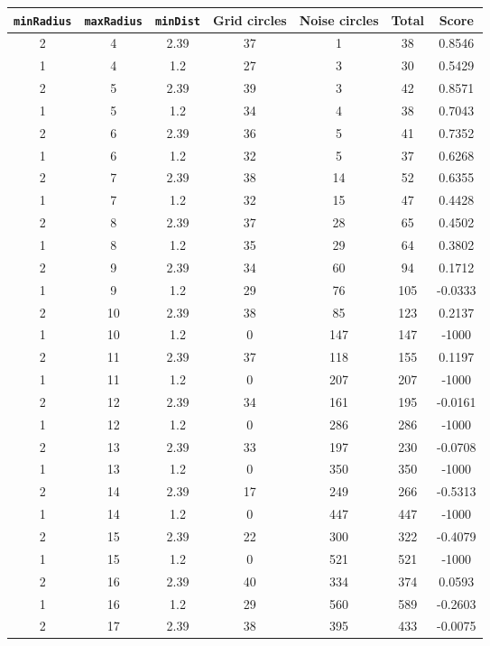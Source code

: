 \documentclass[letterpaper, 12pt]{article}
\begin{document}
\begin{longtable}{|c|c|c|c|c|c|c|}
\hline
\textbf{\texttt{minRadius}} & \textbf{\texttt{maxRadius}} & \textbf{\texttt{minDist}} & \textbf{Grid circles} & \textbf{Noise circles} & \textbf{Total} & \textbf{Score} \\
\hline
2 & 4 & 2.39 & 37 & 1 & 38 & 0.8546 \\
\hline
1 & 4 & 1.2 & 27 & 3 & 30 & 0.5429 \\
\hline
2 & 5 & 2.39 & 39 & 3 & 42 & 0.8571 \\
\hline
1 & 5 & 1.2 & 34 & 4 & 38 & 0.7043 \\
\hline
2 & 6 & 2.39 & 36 & 5 & 41 & 0.7352 \\
\hline
1 & 6 & 1.2 & 32 & 5 & 37 & 0.6268 \\
\hline
2 & 7 & 2.39 & 38 & 14 & 52 & 0.6355 \\
\hline
1 & 7 & 1.2 & 32 & 15 & 47 & 0.4428 \\
\hline
2 & 8 & 2.39 & 37 & 28 & 65 & 0.4502 \\
\hline
1 & 8 & 1.2 & 35 & 29 & 64 & 0.3802 \\
\hline
2 & 9 & 2.39 & 34 & 60 & 94 & 0.1712 \\
\hline
1 & 9 & 1.2 & 29 & 76 & 105 & -0.0333 \\
\hline
2 & 10 & 2.39 & 38 & 85 & 123 & 0.2137 \\
\hline
1 & 10 & 1.2 & 0 & 147 & 147 & -1000 \\
\hline
2 & 11 & 2.39 & 37 & 118 & 155 & 0.1197 \\
\hline
1 & 11 & 1.2 & 0 & 207 & 207 & -1000 \\
\hline
2 & 12 & 2.39 & 34 & 161 & 195 & -0.0161 \\
\hline
1 & 12 & 1.2 & 0 & 286 & 286 & -1000 \\
\hline
2 & 13 & 2.39 & 33 & 197 & 230 & -0.0708 \\
\hline
1 & 13 & 1.2 & 0 & 350 & 350 & -1000 \\
\hline
2 & 14 & 2.39 & 17 & 249 & 266 & -0.5313 \\
\hline
1 & 14 & 1.2 & 0 & 447 & 447 & -1000 \\
\hline
2 & 15 & 2.39 & 22 & 300 & 322 & -0.4079 \\
\hline
1 & 15 & 1.2 & 0 & 521 & 521 & -1000 \\
\hline
2 & 16 & 2.39 & 40 & 334 & 374 & 0.0593 \\
\hline
1 & 16 & 1.2 & 29 & 560 & 589 & -0.2603 \\
\hline
2 & 17 & 2.39 & 38 & 395 & 433 & -0.0075 \\

\end{longtable}
\end{document}
